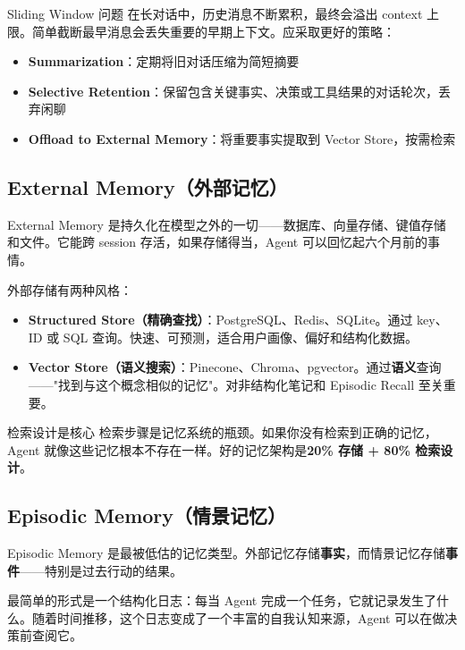 \documentclass[a4paper]{article}
\begin{document}
\begin{warningbox}{Sliding Window 问题}
在长对话中，历史消息不断累积，最终会溢出 context 上限。简单截断最早消息会丢失重要的早期上下文。应采取更好的策略：
\begin{itemize}[leftmargin=1.5em]
    \item \textbf{Summarization}：定期将旧对话压缩为简短摘要
    \item \textbf{Selective Retention}：保留包含关键事实、决策或工具结果的对话轮次，丢弃闲聊
    \item \textbf{Offload to External Memory}：将重要事实提取到 Vector Store，按需检索
\end{itemize}
\end{warningbox}

\subsection{External Memory（外部记忆）}

External Memory 是持久化在模型之外的一切——数据库、向量存储、键值存储和文件。它能跨 session 存活，如果存储得当，Agent 可以回忆起六个月前的事情。

外部存储有两种风格：

\begin{itemize}[leftmargin=2em]
    \item \textbf{Structured Store（精确查找）}：PostgreSQL、Redis、SQLite。通过 key、ID 或 SQL 查询。快速、可预测，适合用户画像、偏好和结构化数据。
    \item \textbf{Vector Store（语义搜索）}：Pinecone、Chroma、pgvector。通过\textbf{语义}查询——"找到与这个概念相似的记忆"。对非结构化笔记和 Episodic Recall 至关重要。
\end{itemize}

\begin{importantbox}{检索设计是核心}
检索步骤是记忆系统的瓶颈。如果你没有检索到正确的记忆，Agent 就像这些记忆根本不存在一样。好的记忆架构是\textbf{20\% 存储 + 80\% 检索设计}。
\end{importantbox}

\subsection{Episodic Memory（情景记忆）}

Episodic Memory 是最被低估的记忆类型。外部记忆存储\textbf{事实}，而情景记忆存储\textbf{事件}——特别是过去行动的结果。

最简单的形式是一个结构化日志：每当 Agent 完成一个任务，它就记录发生了什么。随着时间推移，这个日志变成了一个丰富的自我认知来源，Agent 可以在做决策前查阅它。
\end{document}
